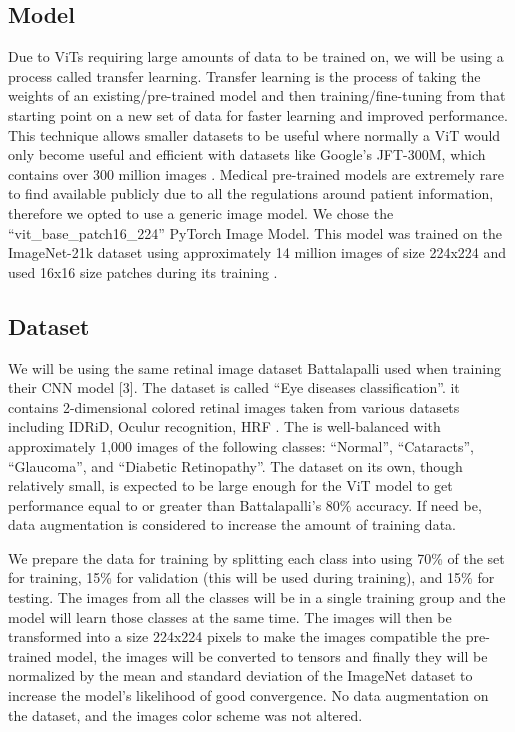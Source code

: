 \documentclass[sigconf]{acmart}
\begin{document}
\subsection{Model}
Due to ViTs requiring large amounts of data to be trained on, we will be using a process called transfer learning. Transfer learning is the process of taking the weights of an existing/pre-trained model and then training/fine-tuning from that starting point on a new set of data for faster learning and improved performance. This technique allows smaller datasets to be useful where normally a ViT would only become useful and efficient with datasets like Google’s JFT-300M, which contains over 300 million images \cite{Matsoukas}. Medical pre-trained models are extremely rare to find available publicly due to all the regulations around patient information, therefore we opted to use a generic image model. We chose the “vit\_base\_patch16\_224” PyTorch Image Model. This model was trained on the ImageNet-21k dataset using approximately 14 million images of size 224x224 and used 16x16 size patches during its training \cite{Huggingface}. 

\subsection{Dataset}
We will be using the same retinal image dataset Battalapalli used when training their CNN model [3]. The dataset is called “Eye diseases classification”. it contains 2-dimensional colored retinal images taken from various datasets including  IDRiD, Oculur recognition, HRF \cite{Kaggle}. The is well-balanced with approximately 1,000 images of the following classes: “Normal”, “Cataracts”, “Glaucoma”, and “Diabetic Retinopathy”. The dataset on its own, though relatively small, is expected to be large enough for the ViT model to get performance equal to or greater than Battalapalli’s 80\% accuracy. If need be, data augmentation is considered to increase the amount of training data.

We prepare the data for training by splitting each class into using 70\% of the set for training, 15\% for validation (this will be used during training), and 15\% for testing.  The images from all the classes will be in a single training group and the model will learn those classes at the same time. The images will then be transformed into a size 224x224 pixels to make the images compatible the pre-trained model, the images will be converted to tensors and finally they will be normalized by the mean and standard deviation of the ImageNet dataset to increase the model’s likelihood of good convergence. No data augmentation on the dataset, and the images color scheme was not altered.
\end{document}
